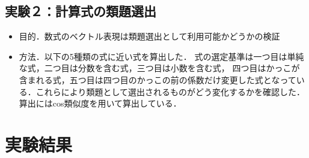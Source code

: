 \documentclass[a4j,11pt,report]{jsbook}
\begin{document}
\subsection{実験２：計算式の類題選出}
\begin{itemize}
  \item 目的．数式のベクトル表現は類題選出として利用可能かどうかの検証
  \item 方法．以下の5種類の式に近い式を算出した．
  式の選定基準は一つ目は単純な式，二つ目は分数を含む式，三つ目は小数を含む式，
  四つ目はかっこが含まれる式，五つ目は四つ目のかっこの前の係数だけ変更した式となっている．これらにより類題として選出されるものがどう変化するかを確認した．
  算出にはcos類似度を用いて算出している．


\end{itemize}

\section{実験結果}
\end{document}

